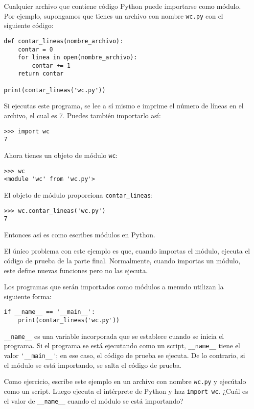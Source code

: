 \documentclass[10pt]{book}
\begin{document}
Cualquier archivo que contiene código Python puede importarse como módulo.
Por ejemplo, supongamos que tienes un archivo con nombre {\tt wc.py} con el siguiente
código:

\begin{verbatim}
def contar_lineas(nombre_archivo):
    contar = 0
    for linea in open(nombre_archivo):
        contar += 1
    return contar

print(contar_lineas('wc.py'))
\end{verbatim}
%
Si ejecutas este programa, se lee a sí mismo e imprime el número
de líneas en el archivo, el cual es 7.
Puedes también importarlo así:

\begin{verbatim}
>>> import wc
7
\end{verbatim}
%
Ahora tienes un objeto de módulo {\tt wc}:

\begin{verbatim}
>>> wc
<module 'wc' from 'wc.py'>
\end{verbatim}
%
El objeto de módulo proporciona \verb"contar_lineas":

\begin{verbatim}
>>> wc.contar_lineas('wc.py')
7
\end{verbatim}
%
Entonces así es como escribes módulos en Python.

El único problema con este ejemplo es que, cuando importas
el módulo, ejecuta el código de prueba de la parte final.  Normalmente,
cuando importas un módulo, este define nuevas funciones pero
no las ejecuta.

Los programas que serán importados como módulos a menudo
utilizan la siguiente forma:

\begin{verbatim}
if __name__ == '__main__':
    print(contar_lineas('wc.py'))
\end{verbatim}
%
\verb"__name__" es una variable incorporada que se establece cuando
se inicia el programa.  Si el programa se está ejecutando como un script,
\verb"__name__" tiene el valor \verb"'__main__'"; en ese
caso, el código de prueba se ejecuta.  De lo contrario,
si el módulo se está importando, se salta el código de prueba.


Como ejercicio, escribe este ejemplo en un archivo con nombre {\tt wc.py} y ejecútalo
como un script.  Luego ejecuta el intérprete de Python y
haz {\tt import wc}.  ¿Cuál es el valor de \verb"__name__"
cuando el módulo se está importando?
\end{document}
